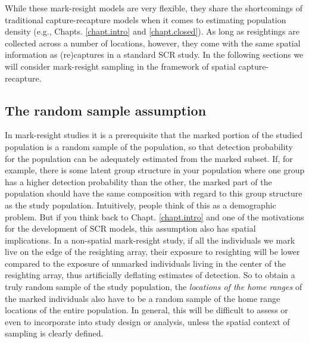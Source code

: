 While these mark-resight models are very flexible, they
share the shortcomings of traditional capture-recapture models
when it comes to estimating population density (e.g.,
Chapts. \ref{chapt.intro} and \ref{chapt.closed}). As long as
resightings are collected across a number of locations,
however, they come with the same spatial information as (re)captures in
a standard SCR study.
In the following sections we will consider mark-resight sampling in
the framework of spatial capture-recapture.


\subsection {The random sample assumption}
\label{partialID.sec.random}

In mark-resight studies it is a prerequisite that the marked portion of the studied population is a random sample of the %
population, so that detection probability for the population can be adequately estimated from the marked subset. If, for example, there is some latent group structure in your population where one group has a higher detection probability than the other, the marked part of the population should have the same composition with regard to this group structure as the study population. Intuitively, people think of this as a demographic problem. But if you think back to Chapt. \ref{chapt.intro} and one of the motivations for the development of SCR models, this assumption also has spatial implications. In a non-spatial mark-resight study, if all the individuals we mark live on the edge of the resighting array, their exposure to resighting will be lower compared to the exposure of unmarked individuals living in the center of the resighting array, thus artificially deflating estimates of detection. So to obtain a truly random sample of the study population, the \emph{locations of the home ranges} of the marked individuals also have to be a random sample of the home range locations of the entire population. %
In general, this %
will be difficult to assess or even to incorporate into study design or analysis, unless the spatial context of sampling is clearly defined.

